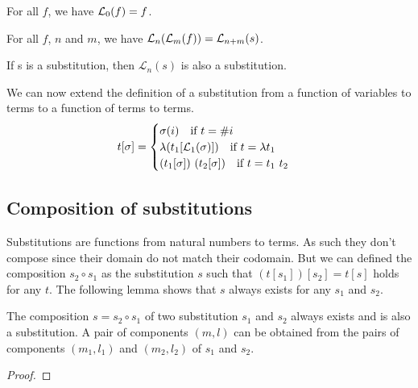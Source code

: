 \begin{lemma}
  For all $f$, we have $\lift[0](f) = f$.
\end{lemma}
\begin{lemma}
  For all $f$, $n$ and $m$, we have $\lift[n](\lift[m](f)) = \lift[{n+m}](s)$.
\end{lemma}
\begin{lemma}
  If s is a substitution, then $\mathcal{L}_{n}(s)$ is also a substitution.
\end{lemma}

We can now extend the definition of a substitution from a function of variables
to terms to a function of terms to terms.
\begin{equation}
  t[\sigma] = \begin{cases}
    \sigma(i) \quad \text{if $t = \#i$} \\
    \lambda (t_1[\lift ({\sigma})]) \quad \text{if $t = \lambda t_1$} \\
    (t_1[\sigma]) \ (t_2[\sigma]) \quad \text{if $t = t_1 \ t_2$}
  \end{cases}
\end{equation}

\subsection{Composition of substitutions}\label{sec:subst_composition}

Substitutions are functions from natural numbers to terms. As such they don't
compose since their domain do not match their codomain. But we can defined the
composition $s_2 \circ s_1$ as the substitution $s$ such that $(t[s_1])[s_2] =
t[s]$ holds for any $t$. The following lemma shows that $s$ always exists for
any $s_1$ and $s_2$.

\begin{lemma}
  The composition $s = s_2 \circ s_1 $ of two substitution $s_1$ and $s_2$
  always exists and is also a substitution. A pair of components $(m, l)$ can be
  obtained from the pairs of components $(m_1, l_1)$ and $(m_2, l_2)$ of $s_1$
  and $s_2$.
\end{lemma}
\begin{proof}
  
\end{proof}